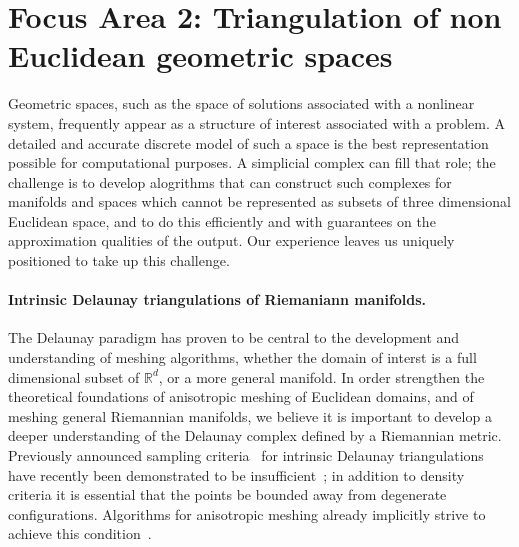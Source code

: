 %

\newcommand{\man}{\mathcal{M}}
\newcommand{\reel}{\mathbb{R}}
\newcommand{\rdee}{\reel^d}
\renewcommand{\pts}{P}
\newcommand{\mesh}{\hat{M}}

\newcommand{\ramsay}[1]{\rred{[[#1]]}}

\section*{Focus Area 2: Triangulation of non Euclidean geometric spaces}

Geometric spaces, such as the space of solutions associated with a
nonlinear system, frequently appear as a structure of interest
associated with a problem.  A detailed and accurate discrete model of
such a space is the best representation possible for computational
purposes. A simplicial complex can fill that role; the challenge is to
develop alogrithms that can construct such complexes for manifolds and
spaces which cannot be represented as subsets of three dimensional
Euclidean space, and to do this efficiently and with guarantees on the
approximation qualities of the output. Our experience leaves us
uniquely positioned to take up this challenge.

\paragraph{Intrinsic Delaunay triangulations of Riemaniann manifolds.}

The Delaunay paradigm has proven to be central to the development and
understanding of meshing algorithms, whether the domain of interst is
a full dimensional subset of $\rdee$, or a more general manifold. In
order strengthen the theoretical foundations of anisotropic meshing of
Euclidean domains, and of meshing general Riemannian manifolds, we
believe it is important to develop a deeper understanding of the
Delaunay complex defined by a Riemannian metric.
%
Previously announced sampling criteria~\cite{leibon2000} for intrinsic
Delaunay triangulations have recently been demonstrated to be
insufficient~\cite{boissonnat2012stab}; in addition to density
criteria it is essential that the points be bounded away from
degenerate configurations. Algorithms for anisotropic meshing already
implicitly strive to achieve this condition~\cite{bwy-luam-08}.

